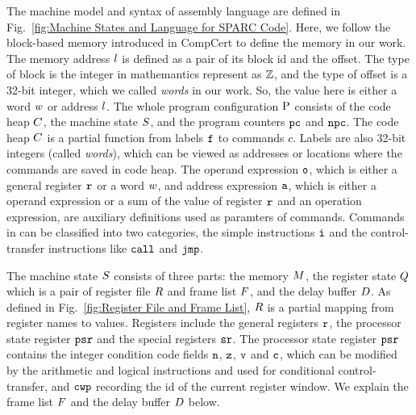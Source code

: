 The machine model and syntax of \sparc{} assembly language
are defined in Fig.~\ref{fig:Machine States and Language for SPARC Code}. 
Here, we follow the block-based memory \cite{CompCertMM} introduced 
in CompCert to define the memory in our work.   
The memory address $l$ is defined as a pair of 
its block id and the offset. The type of block is the integer 
in mathemantics represent as $\mathbb{Z}$, and the type of offset 
is a 32-bit integer, which we called {\it words} in our work. 
So, the value here is either a word $w$ or address $l$.  
The whole program configuration $\text{P}$ consists of the code heap
$C$, the machine state $S$, and the program counters $\texttt{pc}$
and $\texttt{npc}$.
The code heap $C$ is a partial function
from labels $\texttt{f}_{}$ to commands $c$.
Labels are also 32-bit integers (called {\em words}),
which can be viewed as addresses or locations 
where the commands are saved in code heap. 
The operand expression $\texttt{o}$, which is either a general 
register $\texttt{r}_{}$ or a word $w$, 
and address expression $\texttt{a}$, 
which is either a operand expression or a 
sum of the value of register $\texttt{r}_{}$ and an operation 
expression, are auxiliary definitions used as paramters of commands. 
Commands in \sparc{} can be classified into two categories,
the simple instructions $\texttt{i}$ and the
control-transfer instructions like $\texttt{call}$ and $\texttt{jmp}$.

The machine state $S$ consists of three parts:
the memory $M$, the register state $Q$
which is a pair of register file $R$ and frame list $F$,
and the delay buffer $D$.
As defined in Fig.~\ref{fig:Register File and Frame List},
$R$ is a partial mapping
from register names to values.
Registers include the general registers $\texttt{r}$,
the processor state register $\texttt{psr}$
and the special registers $\texttt{sr}$.
The processor state register $\texttt{psr}$ contains
the integer condition code fields $\texttt{n}$,
$\texttt{z}$, $\texttt{v}$ and $\texttt{c}$,
which can be modified by the arithmetic and logical instructions
and used for conditional control-transfer,
and $\texttt{cwp}$ recording the id of the current register window.
We explain the frame list $F$ and the delay buffer
$D$ below.

